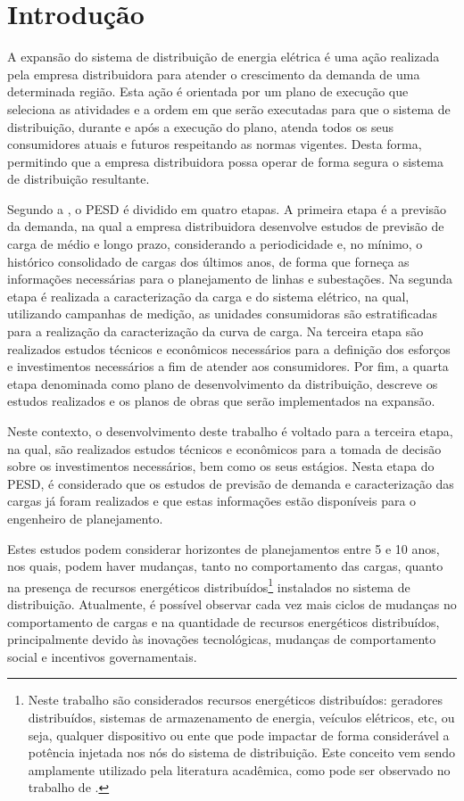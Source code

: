 \chapter[Introdução]{Introdução}
\label{Introdução}

A expansão do sistema de distribuição de energia elétrica é uma ação realizada pela empresa distribuidora para atender o crescimento da demanda de uma determinada região. Esta ação é orientada por um plano de execução que seleciona as atividades e a ordem em que serão executadas para que o sistema de distribuição, durante e após a execução do plano,  atenda todos os seus consumidores atuais e futuros respeitando as normas vigentes. Desta forma, permitindo que a empresa distribuidora possa operar de forma segura o sistema de distribuição resultante.


Segundo a , o \ac{PESD}  é dividido em quatro etapas. A primeira etapa é a previsão da demanda, na qual a empresa distribuidora desenvolve estudos de previsão de carga de médio e longo prazo, considerando a periodicidade e, no mínimo, o histórico consolidado de cargas dos últimos anos, de forma que forneça as informações necessárias para o planejamento de linhas e subestações. Na segunda etapa é realizada a caracterização da carga e do sistema elétrico, na qual, utilizando campanhas de medição, as unidades consumidoras são estratificadas para a realização da caracterização da curva de carga. Na terceira etapa são realizados estudos técnicos e econômicos necessários para a definição dos esforços e investimentos necessários a fim de atender aos consumidores. Por fim, a quarta etapa denominada como plano de desenvolvimento da distribuição, descreve os estudos realizados e os planos de obras que serão implementados na expansão.


Neste contexto,  o desenvolvimento deste trabalho é voltado para a terceira etapa, na qual, são realizados estudos técnicos e econômicos para a tomada de decisão sobre os investimentos necessários, bem como os seus estágios. Nesta etapa do \ac{PESD}, é considerado que os estudos de previsão de demanda e caracterização das cargas já foram realizados e que estas informações estão disponíveis para o engenheiro de planejamento. 

Estes estudos podem considerar horizontes de planejamentos entre 5 e 10 anos, nos quais, podem haver mudanças, tanto no comportamento das cargas, quanto na presença de recursos energéticos distribuídos\footnote{Neste trabalho são considerados recursos energéticos distribuídos: geradores distribuídos, sistemas de armazenamento de energia, veículos elétricos, etc, ou seja, qualquer dispositivo ou ente que pode impactar de forma considerável a potência injetada nos nós do sistema de distribuição. Este conceito vem sendo amplamente utilizado pela literatura acadêmica, como pode ser observado no trabalho de .} instalados no sistema de distribuição. Atualmente, é possível observar cada vez mais ciclos de mudanças no comportamento de cargas e na quantidade de recursos energéticos distribuídos, principalmente devido às inovações tecnológicas, mudanças de comportamento social e incentivos governamentais.

